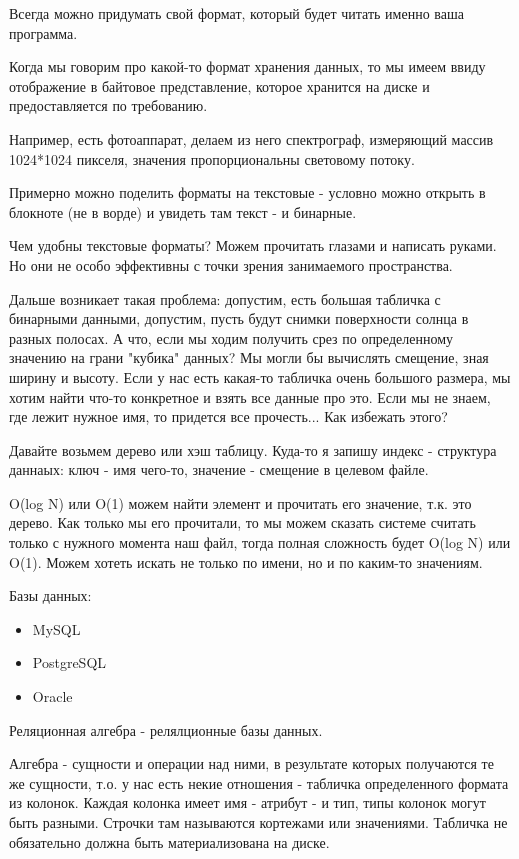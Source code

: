 \documentclass[a4paper, 12pt]{article}
\begin{document}
	Всегда можно придумать свой формат, который будет читать именно ваша программа. 
	
	Когда мы говорим про какой-то формат хранения данных, то мы имеем ввиду отображение в байтовое представление, которое хранится на диске и предоставляется по требованию.
	
	Например, есть фотоаппарат, делаем из него спектрограф, измеряющий массив 1024*1024 пикселя, значения пропорциональны световому потоку.
	
	Примерно можно поделить форматы на текстовые - условно можно открыть в блокноте (не в ворде) и увидеть там текст - и бинарные. 
	
	Чем удобны текстовые форматы? Можем прочитать глазами и написать руками. Но они не особо эффективны с точки зрения занимаемого пространства.
	
	Дальше возникает такая проблема: допустим, есть большая табличка с бинарными данными, допустим, пусть будут снимки поверхности солнца в разных полосах. А что, если мы ходим получить срез по определенному значению на грани "кубика" данных? Мы могли бы вычислять смещение, зная ширину и высоту. Если у нас есть какая-то табличка очень большого размера, мы хотим найти что-то конкретное и взять все данные про это. Если мы не знаем, где лежит нужное имя, то придется все прочесть... Как избежать этого?
	
	Давайте возьмем дерево или хэш таблицу. Куда-то я запишу индекс - структура даннаых: ключ - имя чего-то, значение - смещение в целевом файле. 
	
	O(log N) или O(1) можем найти элемент и прочитать его значение, т.к. это дерево. Как только мы его прочитали, то мы можем сказать системе считать только с нужного момента наш файл, тогда полная сложность будет O(log N) или O(1). Можем хотеть искать не только по имени, но и по каким-то значениям. 
	
	Базы данных:
	\begin{itemize}
		\item MySQL 
		\item PostgreSQL 
		\item Oracle 
		
	\end{itemize}
	
	Реляционная алгебра - релялционные базы данных.
	
	Алгебра - сущности и операции над ними, в результате которых получаются те же сущности, т.о. у нас есть некие отношения - табличка определенного формата из колонок. Каждая колонка имеет имя - атрибут - и тип, типы колонок могут быть разными. Строчки там называются кортежами или значениями. Табличка не обязательно должна быть материализована на диске. 
	
\end{document}
